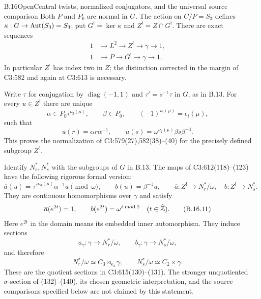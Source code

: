 \begin{statement}{B.16}{Open}{Central twists, normalized conjugators, and the universal source comparison}
Both $P$ and $P_0$ are normal in $G$. The action on $C/P=S_3$
defines $\kappa:G\to\operatorname{Aut}(S_3)=S_3$; put $G^!=\ker\kappa$ and
$Z^!=Z\cap G^!$. There are exact sequences
\[
\begin{aligned}
 1&\longrightarrow L^2\longrightarrow Z^!
       \longrightarrow\gamma\longrightarrow1,\\
 1&\longrightarrow P\longrightarrow G^!
       \longrightarrow\gamma\longrightarrow1.
\end{aligned}
 \tag{B.16.7}
\]
In particular $Z^!$ has index two in $Z$; the distinction corrected
in the margin of C3:582 and again at C3:613 is necessary.

Write $\tau$ for conjugation by $\operatorname{diag}(-1,1)$ and
$\tau'=s^{-1}\tau$ in $G$, as in B.13. For every $u\in Z^!$ there
are unique
\[
 \alpha\in P_0\tau^{\nu_3(\mu)},\qquad\beta\in P_0,
 \qquad (-1)^{\nu_i(\mu)}=\epsilon_i(\mu),
 \tag{B.16.8}
\]
such that
\[
 u(r)=\alpha r\alpha^{-1},\qquad
 u(s)=\omega^{\nu_2(\mu)}\beta s\beta^{-1}.
 \tag{B.16.9}
\]
This proves the normalization of C3:579(27),582(38)--(40) for
the precisely defined subgroup $Z^!$.

Identify $N_r^*,N_s^*$ with the subgroups of $G$ in B.13. The maps
of C3:612(118)--(123) have the following rigorous formal version:
\[
 \overline a(u)=\tau'^{\nu_3(\mu)}\alpha^{-1}u\pmod\omega,
 \qquad b(u)=\beta^{-1}u,
 \qquad
 \overline a:Z^!\to N_r^*/\omega,\quad b:Z^!\to N_s^*.
 \tag{B.16.10}
\]
They are continuous homomorphisms over $\gamma$ and satisfy
\[
 \overline a(e^{2t})=1,\qquad b(e^{2t})=\omega^{t\bmod2}
 \quad(t\in\widehat{\mathbb Z}).
 \tag{B.16.11}
\]
Here $e^{2t}$ in the domain means its embedded inner automorphism.
They induce sections
\[
 a_\gamma:\gamma\to N_r^*/\omega,\qquad
 b_\gamma:\gamma\to N_s^*/\omega,
 \tag{B.16.12}
\]
and therefore
\[
 N_r^*/\omega\simeq C_3\rtimes_{\epsilon_3}\gamma,
 \qquad N_s^*/\omega\simeq C_2\times\gamma.
 \tag{B.16.13}
\]
These are the quotient sections in C3:615(130)--(131). The stronger
unquotiented $\sigma$-section of (132)--(140), its chosen geometric
interpretation, and the source comparisons specified below are not
claimed by this statement.
\end{statement}

